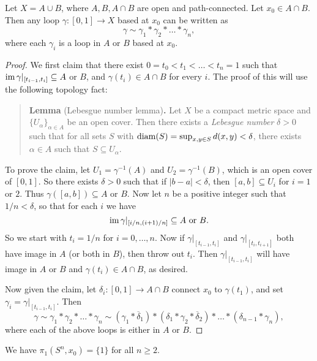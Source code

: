 \begin{lemma}
  Let $X = A \cup B$, where $A, B, A \cap B$
  are open and path-connected. Let $x_0 \in A \cap B$.
  Then any loop $\gamma : [0, 1] \to X$ based at
  $x_0$ can be written as
  \[
    \gamma \sim \gamma_1 * \gamma_2 * \dots * \gamma_n,
  \]
  where each $\gamma_i$ is a loop in $A$ or $B$
  based at $x_0$.
\end{lemma}

\begin{proof}
  We first claim that there exist
  $0 = t_0 < t_1 < \dots < t_n = 1$ such that
  $\operatorname{im} \gamma|_{[t_{i - 1}, t_i]} \subseteq A$
  or $B$, and $\gamma(t_i) \in A \cap B$ for every $i$.
  The proof of this will use the following
  topology fact:
  \begin{quote}
    \textbf{Lemma} (Lebesgue number lemma)\textbf{.}
    Let $X$ be a compact
    metric space and $\{U_\alpha\}_{\alpha \in A}$ be
    an open cover. Then there exists a \emph{Lebesgue number}
    $\delta > 0$ such that for all sets $S$ with
    $\operatorname{diam}(S) = \sup_{x, y \in S} d(x, y) < \delta$,
    there exists $\alpha \in A$ such that $S \subseteq U_\alpha$.
  \end{quote}
  To prove the claim, let $U_1 = \gamma^{-1}(A)$
  and $U_2 = \gamma^{-1}(B)$, which is an open
  cover of $[0, 1]$. So there exists $\delta > 0$
  such that if $|b - a| < \delta$, then
  $[a, b] \subseteq U_i$ for $i = 1$ or $2$. Thus
  $\gamma([a, b]) \subseteq A$ or $B$. Now let
  $n$ be a positive integer such that $1 / n < \delta$,
  so that for each $i$ we have
  \[\operatorname{im} \gamma|_{[i / n, (i + 1) / n]} \subseteq A \text{ or } B.\]
  So we start with $t_i = 1 / n$ for $i = 0, \dots, n$.
  Now if $\gamma|_{[t_{i - 1}, t_i]}$ and
  $\gamma|_{[t_i, t_{i + 1}]}$ both have image in
  $A$ (or both in $B$), then throw out $t_i$. Then
  $\gamma|_{[t_{i - 1}, t_{i}]}$ will have image in
  $A$ or $B$ and $\gamma(t_{i}) \in A \cap B$,
  as desired.

  Now given the claim, let
  $\delta_i : [0, 1] \to A \cap B$ connect
  $x_0$ to $\gamma(t_1)$, and set
  $\gamma_i = \gamma|_{[t_{i - 1}, t_i]}$. Then
  \[
    \gamma \sim \gamma_1 * \gamma_2 * \dots * \gamma_n
    \sim (\gamma_1 * \overline{\delta}_1)
    * (\delta_1 * \gamma_2 * \overline{\delta}_2)
    * \dots
    * (\delta_{n - 1} * \gamma_n),
  \]
  where each of the above loops is either in
  $A$ or $B$.
\end{proof}

\begin{theorem}
  We have $\pi_1(S^n, x_0) = \{1\}$ for all $n \ge 2$.
\end{theorem}

